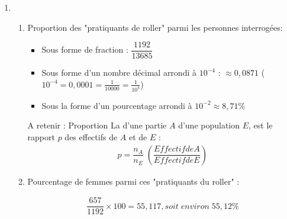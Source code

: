 \documentclass[xcolor={dvipsnames}]{beamer}
\begin{document}
\begin{frame}{}

\begin{enumerate}%
	\item 
	\begin{enumerate} [a]
		\item Proportion des "pratiquants de roller" parmi les personnes interrogées:\pause
		\begin{itemize}
			\item Sous forme de fraction : $\dfrac{1192}{13685}$\pause
			\item Sous forme d'un nombre décimal arrondi à $10^{-4}$ : $\approx 0,0871$ ($10^{-4} = 0,0001=\frac{1}{10000}=\frac{1}{10^4}$)\pause
			\item Sous la forme d'un pourcentage arrondi à $10^{-2} \approx 8,71 \% $\pause
		\end{itemize}
		
		\vspace*{0.2cm}
		
		\begin{alertblock}{A retenir : Proportion}
			La  d'une partie $A$ d'une population $E$, est le rapport $p$ des effectifs de $A$ et de $E$ :
			\vspace*{-0.2cm}
			\begin{eqnarray*}
				p = \dfrac{n_A}{n_E} \; \left(\dfrac{Effectif de A}{Effectif de E}\right)
			\end{eqnarray*}
		\end{alertblock}\pause
	
		\vspace*{0.2cm}
		
		\item Pourcentage de femmes parmi ces "pratiquants du roller" :\pause
		
		\begin{align*}
		\dfrac{657}{1192} \times 100 = 55,117, soit\; environ\; 55,12 \%
		\end{align*}
	\end{enumerate}
\end{enumerate}
\end{frame}
\end{document}
